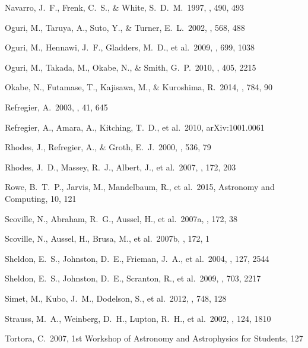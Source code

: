 \documentclass[apj]{emulateapj}
\begin{document}
\begin{thebibliography}{}
  Navarro, J.~F., Frenk,
  C.~S., \& White, S.~D.~M.\ 1997, \apj, 490, 493

  Oguri, M., Taruya, A.,
   Suto, Y., \& Turner, E.~L.\ 2002, \apj, 568, 488

  Oguri, M., Hennawi,
J.~F., Gladders, M.~D., et al.\ 2009, \apj, 699, 1038

  Oguri, M., Takada, M.,
Okabe, N., \& Smith, G.~P.\ 2010, \mnras, 405, 2215

  Okabe, N., Futamase, T.,
  Kajisawa, M., \& Kuroshima, R.\ 2014, \apj, 784, 90

  Refregier, A.\ 2003, \araa, 41, 645
 
  Refregier, A., Amara, 
A., Kitching, T.~D., et al.\ 2010, arXiv:1001.0061 

  Rhodes, J., Refregier,
A., \& Groth, E.~J.\ 2000, \apj, 536, 79

  Rhodes, J.~D., Massey,
  R.~J., Albert, J., et al.\ 2007, \apjs, 172, 203

 Rowe, B.~T.~P.,
Jarvis, M., Mandelbaum, R., et al.\ 2015, Astronomy and Computing, 10, 121


 Scoville, N., Abraham,
R.~G., Aussel, H., et al.\ 2007a, \apjs, 172, 38


 Scoville, N., Aussel,
H., Brusa, M., et al.\ 2007b, \apjs, 172, 1


  Sheldon, E.~S.,
  Johnston, D.~E., Frieman, J.~A., et al.\ 2004, \aj, 127, 2544

  Sheldon, E.~S.,
  Johnston, D.~E., Scranton, R., et al.\ 2009, \apj, 703, 2217


  Simet, M., Kubo, J.~M.,
  Dodelson, S., et al.\ 2012, \apj, 748, 128

   Strauss, M.~A.,
Weinberg, D.~H., Lupton, R.~H., et al.\ 2002, \aj, 124, 1810

  Tortora, C.\ 2007, 1st
  Workshop of Astronomy and Astrophysics for Students, 127




\end{thebibliography}
\end{document}

